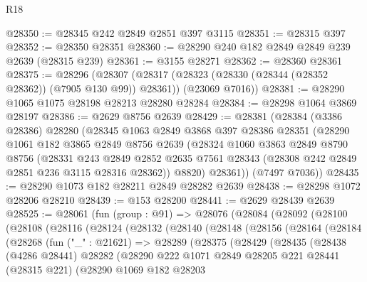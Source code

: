 \begin{lexlean}{R18}
\begin{coremodule}
@28350 := @28345 @242 @2849 @2851 @397 @3115
@28351 := @28315 @397
@28352 := @28350 @28351
@28360 := @28290 @240 @182 @2849 @2849 @239 @2639 (@28315 @239)
@28361 := @3155 @28271
@28362 := @28360 @28361
@28375 := @28296
    (@28307
      (@28317 (@28323 (@28330 (@28344 (@28352 @28362)) (@7905 @130 @99)) @28361))
      (@23069 @7016))
@28381 := @28290 @1065 @1075 @28198 @28213 @28280 @28284
@28384 := @28298 @1064 @3869 @28197
@28386 := @2629 @8756 @2639
@28429 := @28381
    (@28384
      (@3386 @28386)
      @28280
      (@28345
        @1063
        @2849
        @3868
        @397
        @28386
        @28351
        (@28290
          @1061
          @182
          @3865
          @2849
          @8756
          @2639
          (@28324
            @1060
            @3863
            @2849
            @8790
            @8756
            (@28331
              @243
              @2849
              @2852
              @2635
              @7561
              @28343
              (@28308 @242 @2849 @2851 @236 @3115 @28316 @28362))
            @8820)
          @28361))
      (@7497 @7036))
@28435 := @28290 @1073 @182 @28211 @2849 @28282 @2639
@28438 := @28298 @1072 @28206 @28210
@28439 := @153 @28200
@28441 := @2629 @28439 @2639
@28525 := @28061
    (fun (group : @91) =>
    @28076
      (@28084
        (@28092
          (@28100
            (@28108
              (@28116
                (@28124
                  (@28132
                    (@28140
                      (@28148
                        (@28156
                          (@28164
                            (@28184
                              (@28268
                                (fun ("_" : @21621) =>
                                @28289
                                  (@28375
                                    (@28429
                                      (@28435
                                        (@28438
                                          (@4286 @28441)
                                          @28282
                                          (@28290
                                            @222
                                            @1071
                                            @2849
                                            @28205
                                            @221
                                            @28441
                                            (@28315 @221)
                                            (@28290
                                              @1069
                                              @182
                                              @28203

\end{coremodule}
\end{lexlean}
